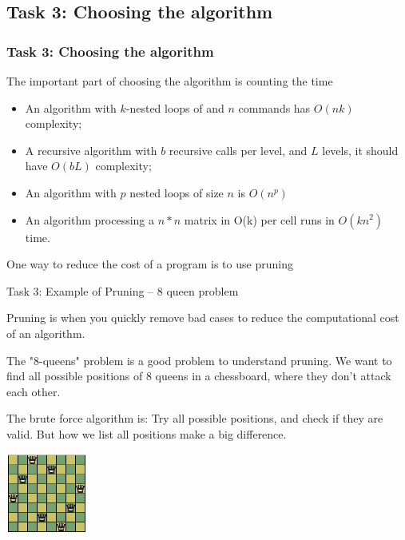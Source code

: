 \subsection{Task 3: Choosing the algorithm}


\begin{frame}
  \frametitle{Task 3: Choosing the algorithm}
  The important part of choosing the algorithm is \alert{counting the time}
  \bigskip

  \begin{itemize}
    \item An algorithm with $k$-nested loops of and $n$ commands
      has $O(nk)$ complexity;
    \item A recursive algorithm with $b$ recursive calls per level, and $L$
      levels, it should have $O(bL)$ complexity;
    \item An algorithm with $p$ nested loops of size $n$ is $O(n^p)$
    \item An algorithm processing a $n*n$ matrix in O(k) per cell runs
      in $O(kn^2)$ time.
  \end{itemize}
  \bigskip

  One way to reduce the cost of a program is to use \alert{pruning}
\end{frame}

\begin{frame}{Task 3: Example of Pruning -- 8 queen problem}

  \alert{Pruning} is when you quickly remove bad cases to reduce the
  computational cost of an algorithm.
  \bigskip

  The "8-queens" problem is a good problem to understand pruning. We
  want to find all possible positions of 8 queens in a chessboard,
  where they don't attack each other.
  \bigskip

  The brute force algorithm is: Try all possible positions, and check if
  they are valid. \alert{But how we list all positions make a big difference}.

  \hfill \includegraphics[width=0.2\textwidth]{img/8queen}
\end{frame}

